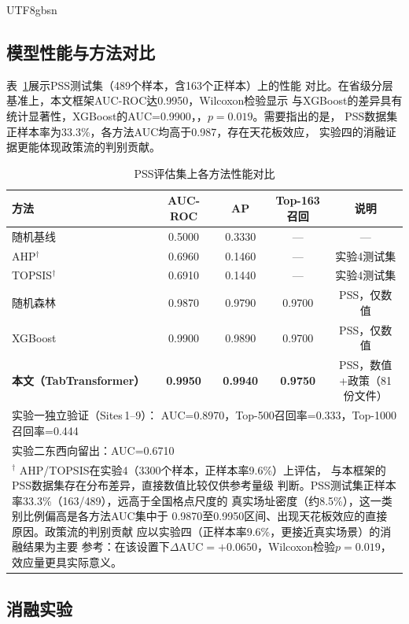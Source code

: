 \documentclass[12pt, a4paper]{article}
\begin{document}
\begin{CJK}{UTF8}{gbsn}
\subsection{模型性能与方法对比}

表~\ref{tab:perf}展示PSS测试集（489个样本，含163个正样本）上的性能
对比。在省级分层基准上，本文框架AUC-ROC达0.9950，Wilcoxon检验显示
与XGBoost的差异具有统计显著性，XGBoost的AUC=0.9900，，$p=0.019$。需要指出的是，
PSS数据集正样本率为33.3\%，各方法AUC均高于0.987，存在天花板效应，
实验四的消融证据更能体现政策流的判别贡献。

\begin{table}[H]
\centering
\caption{PSS评估集上各方法性能对比}
\label{tab:perf}
\small
\begin{tabular}{lcccc}
\toprule
\textbf{方法} & \textbf{AUC-ROC} & \textbf{AP} &
\textbf{Top-163召回} & \textbf{说明} \\
\midrule
随机基线       & 0.5000 & 0.3330 & —     & — \\
AHP$^\dagger$  & 0.6960 & 0.1460 & —     & 实验4测试集 \\
TOPSIS$^\dagger$& 0.6910 & 0.1440 & —    & 实验4测试集 \\
随机森林       & 0.9870 & 0.9790 & 0.9700 & PSS，仅数值 \\
XGBoost        & 0.9900 & 0.9890 & 0.9700 & PSS，仅数值 \\
\textbf{本文（TabTransformer）} &
  \textbf{0.9950} & \textbf{0.9940} & \textbf{0.9750} &
  PSS，数值+政策（81份文件） \\
\midrule
\multicolumn{5}{l}{实验一独立验证（Sites\,1--9）：
  AUC=0.8970，Top-500召回率=0.333，Top-1000召回率=0.444} \\
\multicolumn{5}{l}{实验二东西向留出：AUC=0.6710} \\
\bottomrule
\multicolumn{5}{p{0.9\textwidth}}{\small $^\dagger$
  AHP/TOPSIS在实验4（3300个样本，正样本率9.6\%）上评估，
  与本框架的PSS数据集存在分布差异，直接数值比较仅供参考量级
  判断。PSS测试集正样本率33.3\%（163/489），远高于全国格点尺度的
  真实场址密度（约8.5\%），这一类别比例偏高是各方法AUC集中于
  0.9870至0.9950区间、出现天花板效应的直接原因。政策流的判别贡献
  应以实验四（正样本率9.6\%，更接近真实场景）的消融结果为主要
  参考：在该设置下$\Delta\text{AUC}=+0.0650$，Wilcoxon检验$p=0.019$，
  效应量更具实际意义。}
\end{tabular}
\end{table}

\subsection{消融实验}
\label{sec:ablation}


\end{CJK}
\end{document}

